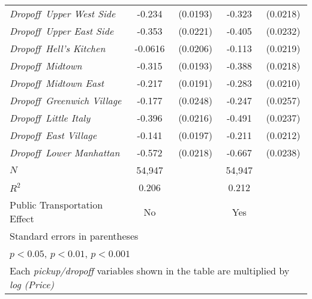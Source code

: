 \begin{table}[h]
{\begin{center}
\begin{tabular}{l*{2}{cc}}
\hspace{3cm}\textit{Dropoff\, Upper West Side}&      -0.234\sym{***}&    (0.0193)&      -0.323\sym{***}&    (0.0218)\\
\hspace{3cm}\textit{Dropoff\, Upper East Side}&      -0.353\sym{***}&    (0.0221)&      -0.405\sym{***}&    (0.0232)\\
\hspace{3cm}\textit{Dropoff\, Hell's Kitchen}&     -0.0616\sym{**} &    (0.0206)&      -0.113\sym{***}&    (0.0219)\\
\hspace{3cm}\textit{Dropoff\, Midtown}&      -0.315\sym{***}&    (0.0193)&      -0.388\sym{***}&    (0.0218)\\
\hspace{3cm}\textit{Dropoff\, Midtown East}&      -0.217\sym{***}&    (0.0191)&      -0.283\sym{***}&    (0.0210)\\
\hspace{3cm}\textit{Dropoff\, Greenwich Village}&      -0.177\sym{***}&    (0.0248)&      -0.247\sym{***}&    (0.0257)\\
\hspace{3cm}\textit{Dropoff\, Little Italy}&      -0.396\sym{***}&    (0.0216)&      -0.491\sym{***}&    (0.0237)\\
\hspace{3cm}\textit{Dropoff\, East Village}&      -0.141\sym{***}&    (0.0197)&      -0.211\sym{***}&    (0.0212)\\
\hspace{3cm}\textit{Dropoff\, Lower Manhattan}&      -0.572\sym{***}&    (0.0218)&      -0.667\sym{***}&    (0.0238)\\
\hline
\(N\)       &       54,947         &            &       54,947         &            \\
\(R^{2}\)   &       0.206         &            &       0.212         &            \\
Public Transportation Effect &     No               &            &               Yes      &            \\
\hline\hline
\multicolumn{5}{l}{\footnotesize Standard errors in parentheses}\\
\multicolumn{5}{l}{\footnotesize \sym{*} \(p<0.05\), \sym{**} \(p<0.01\), \sym{***} \(p<0.001\)}\\
\multicolumn{5}{l}{\footnotesize Each \textit{pickup/dropoff} variables shown in the table are multiplied by \textit{log (Price)}}\\
\end{tabular}
\end{center}
}

\end{table}
